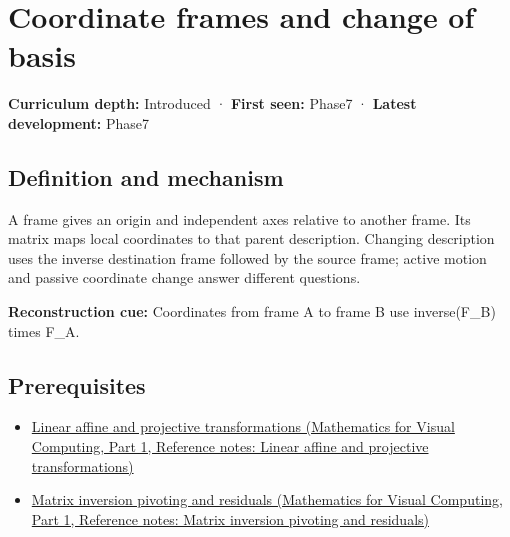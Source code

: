 \hypertarget{appendix-1bae9457dbc3}{}\label{referencestart:appendix-1bae9457dbc3}
\section{Coordinate frames and change of basis}\label{appendix-1bae9457dbc3-coordinate-frames-and-change-of-basis}

\hypertarget{appendix-1bae9457dbc3-coordinate-frames-and-change-of-basis}{}

\textbf{Curriculum depth:} Introduced · \textbf{First seen:} Phase7 · \textbf{Latest development:} Phase7

\begin{allmightroledefinition}

\subsection{Definition and mechanism}\label{appendix-1bae9457dbc3-definition-and-mechanism}

\hypertarget{appendix-1bae9457dbc3-definition-and-mechanism}{}

A frame gives an origin and independent axes relative to another frame. Its matrix maps local coordinates to that parent description. Changing description uses the inverse destination frame followed by the source frame; active motion and passive coordinate change answer different questions.

\end{allmightroledefinition}

\textbf{Reconstruction cue:} Coordinates from frame A to frame B use inverse(F\_B) times F\_A.

\subsection{Prerequisites}\label{appendix-1bae9457dbc3-prerequisites}

\hypertarget{appendix-1bae9457dbc3-prerequisites}{}

\begin{itemize}
\tightlist
\item
  \href{../02-Mathematics-for-Visual-Computing-P01/main.pdf\#nameddest=appendix-0bf0ca73f735}{Linear affine and projective transformations (Mathematics for Visual Computing, Part 1, Reference notes: Linear affine and projective transformations)}
\item
  \href{../02-Mathematics-for-Visual-Computing-P01/main.pdf\#nameddest=appendix-48d2e66378ab}{Matrix inversion pivoting and residuals (Mathematics for Visual Computing, Part 1, Reference notes: Matrix inversion pivoting and residuals)}
\end{itemize}

